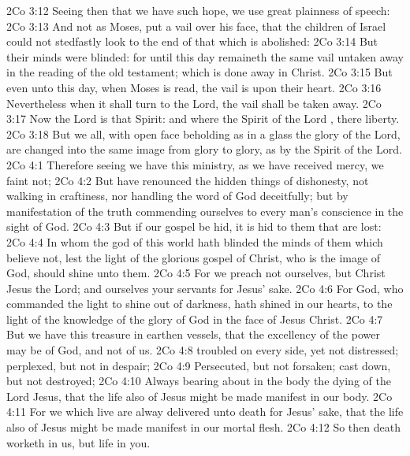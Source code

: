\vs 2Co 3:12 Seeing then that we have such hope, we use great plainness of speech:
\vs 2Co 3:13 And not as Moses,  put a vail over his face, that the children of Israel could not stedfastly look to the end of that which is abolished:
\vs 2Co 3:14 But their minds were blinded: for until this day remaineth the same vail untaken away in the reading of the old testament; which  is done away in Christ.
\vs 2Co 3:15 But even unto this day, when Moses is read, the vail is upon their heart.
\vs 2Co 3:16 Nevertheless when it shall turn to the Lord, the vail shall be taken away.
\vs 2Co 3:17 Now the Lord is that Spirit: and where the Spirit of the Lord , there  liberty.
\vs 2Co 3:18 But we all, with open face beholding as in a glass the glory of the Lord, are changed into the same image from glory to glory,  as by the Spirit of the Lord.
\vs 2Co 4:1 Therefore seeing we have this ministry, as we have received mercy, we faint not;
\vs 2Co 4:2 But have renounced the hidden things of dishonesty, not walking in craftiness, nor handling the word of God deceitfully; but by manifestation of the truth commending ourselves to every man's conscience in the sight of God.
\vs 2Co 4:3 But if our gospel be hid, it is hid to them that are lost:
\vs 2Co 4:4 In whom the god of this world hath blinded the minds of them which believe not, lest the light of the glorious gospel of Christ, who is the image of God, should shine unto them.
\vs 2Co 4:5 For we preach not ourselves, but Christ Jesus the Lord; and ourselves your servants for Jesus' sake.
\vs 2Co 4:6 For God, who commanded the light to shine out of darkness, hath shined in our hearts, to  the light of the knowledge of the glory of God in the face of Jesus Christ.
\vs 2Co 4:7 But we have this treasure in earthen vessels, that the excellency of the power may be of God, and not of us.
\vs 2Co 4:8  troubled on every side, yet not distressed;  perplexed, but not in despair;
\vs 2Co 4:9 Persecuted, but not forsaken; cast down, but not destroyed;
\vs 2Co 4:10 Always bearing about in the body the dying of the Lord Jesus, that the life also of Jesus might be made manifest in our body.
\vs 2Co 4:11 For we which live are alway delivered unto death for Jesus' sake, that the life also of Jesus might be made manifest in our mortal flesh.
\vs 2Co 4:12 So then death worketh in us, but life in you.
